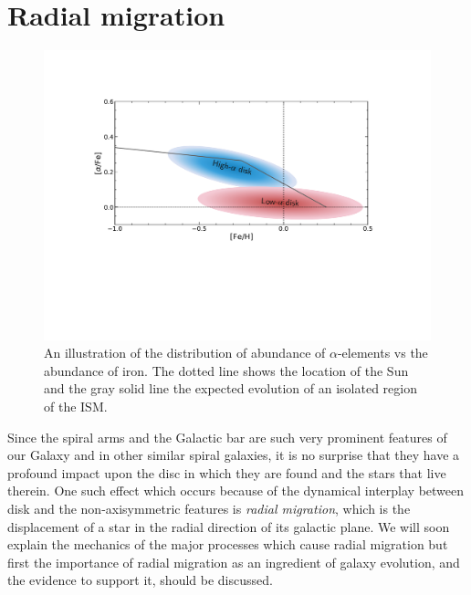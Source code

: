 \section{Radial migration}\label{sec:migration}
\begin{figure}[t]
    \centering
    \includegraphics[width=.9\textwidth]{images/alphaoverfe.pdf}
    \caption{An illustration of the distribution of abundance of $\alpha$-elements vs the abundance of iron. The dotted line shows the location of the Sun and the gray solid line the expected evolution of an isolated region of the ISM.} %
    \label{fig:alphaoverfe}
\end{figure}
Since the spiral arms and the Galactic bar are such very prominent features of our Galaxy and in other similar spiral galaxies, it is no surprise that they have a profound impact upon the disc in which they are found and the stars that live therein. One such effect which occurs because of the dynamical interplay between disk and the non-axisymmetric features is \textit{radial migration}, which is the displacement of a star in the radial direction of its galactic plane. We will soon explain the mechanics of the major processes which cause radial migration but first the importance of radial migration as an ingredient of galaxy evolution, and the evidence to support it, should be discussed.


